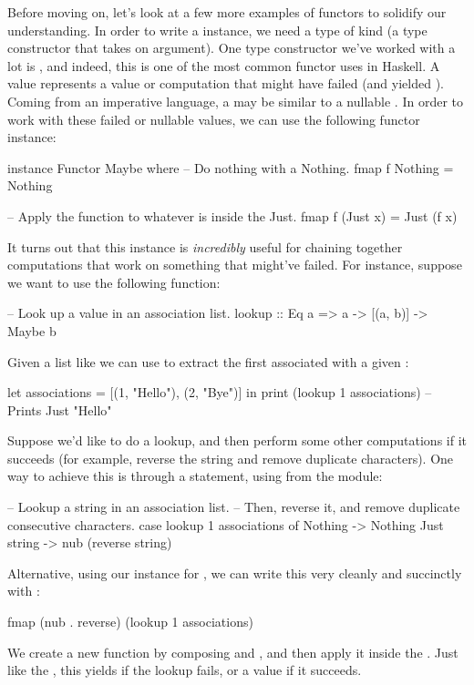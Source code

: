 Before moving on, let's look at a few more examples of functors to solidify our understanding. In
order to write a  instance, we need a type of kind \inline{* -> *} (a type
constructor that takes on argument). One type constructor we've worked with a lot is ,
and indeed, this is one of the most common functor uses in Haskell. A  value
represents a value or computation that might have failed (and yielded ). Coming from
an imperative language, a  may be similar to a nullable . In order to
work with these failed or nullable values, we can use the following functor instance:
\begin{haskell}
instance Functor Maybe where
  -- Do nothing with a Nothing.
  fmap f Nothing = Nothing

  -- Apply the function to whatever is inside the Just.
  fmap f (Just x) = Just (f x)
\end{haskell}

It turns out that this instance is \emph{incredibly} useful for chaining together computations that
work on something that might've failed. For instance, suppose we want to use the following
 function:
\begin{haskell}
-- Look up a value in an association list.
lookup :: Eq a => a -> [(a, b)] -> Maybe b
\end{haskell}
Given a list like  we can use  to extract the first
 associated with a given :
\begin{haskell}
let associations = [(1, "Hello"), (2, "Bye")] in
  print (lookup 1 associations) -- Prints Just "Hello"
\end{haskell}
Suppose we'd like to do a lookup, and then perform some other computations if it succeeds (for
example, reverse the string and remove duplicate characters). One way to achieve this is through a
 statement, using  from the  module:
\begin{haskell}
-- Lookup a string in an association list.
-- Then, reverse it, and remove duplicate consecutive characters.
case lookup 1 associations of
  Nothing -> Nothing
  Just string -> nub (reverse string)
\end{haskell}
Alternative, using our  instance for , we can write this very cleanly
and succinctly with :
\begin{haskell}
fmap (nub . reverse) (lookup 1 associations)
\end{haskell}
We create a new function by composing  and , and then apply it inside
the . Just like the , this yields  if the lookup fails,
or a  value if it succeeds.

